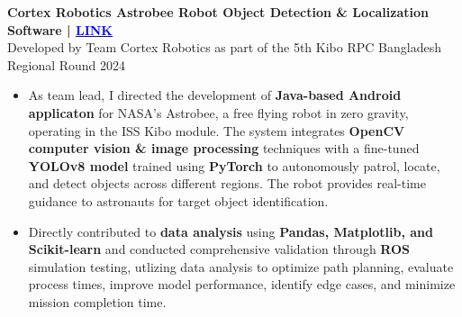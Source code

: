 \noindent
{\noindent\fontsize{12pt}{15pt}\bfseries Cortex Robotics Astrobee Robot Object Detection \& Localization Software | \href{https://www.linkedin.com/posts/humam-hossain-7ab762230_we-are-delighted-to-announce-that-cortex-activity-7216897808526630913-fK7n?utm_source=share&utm_medium=member_desktop&rcm=ACoAADnGy_MBOD27r03GQ-w_ksuO4sb1-cAV6_A}{\underline{\textcolor{blue}{LINK}}}} \\
{\fontsize{9pt}{11pt}Developed by Team Cortex Robotics as part of the 5th Kibo RPC Bangladesh Regional Round 2024}
\begin{itemize}[leftmargin=1em, itemsep=0.1em, labelsep=0.5em]
    \item As team lead, I directed the development of \textbf{Java-based Android applicaton} for NASA's Astrobee, a free flying robot in zero gravity, operating in the ISS Kibo module. The system integrates \textbf{OpenCV computer vision \& image processing} techniques with a fine-tuned \textbf{YOLOv8 model} trained using \textbf{PyTorch} to autonomously patrol, locate, and detect objects across different regions. The robot provides real-time guidance to astronauts for target object identification. 
    
    \item Directly contributed to \textbf{data analysis} using \textbf{Pandas, Matplotlib, and Scikit-learn} and conducted comprehensive validation through \textbf{ROS} simulation testing, utlizing data analysis to optimize path planning, evaluate process times, improve model performance, identify edge cases, and minimize mission completion time.
\end{itemize}